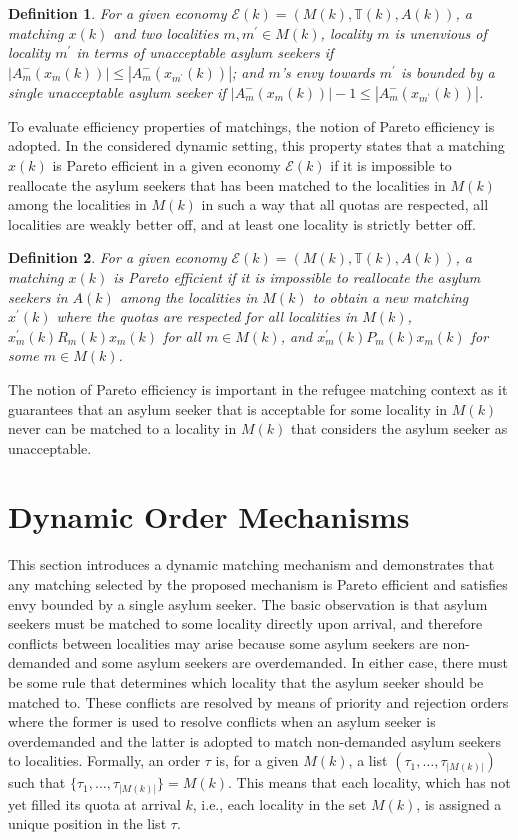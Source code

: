 \documentclass[12pt,fleqn]{article}
\newtheorem{definition}{Definition}
\begin{document}
\begin{definition}\rm\label{DEF:1-Envy_UNACC}
For a given economy $\mathcal{E}(k)=(M(k),\mathbb{T}(k),A(k))$, a matching $x(k)$ and two localities $m,m^\prime\in M(k)$, locality $m$ is unenvious of locality $m^\prime$ in terms of unacceptable asylum seekers if $|A_m^-(x_m(k))|\leq |A_m^-(x_{m^\prime}(k))|$; and $m$'s envy towards $m^\prime$ is bounded by a single unacceptable asylum seeker if $|A_m^-(x_m(k))|-1\leq |A_m^-(x_{m^\prime}(k))|$.
\end{definition}
\noindent To evaluate efficiency properties of matchings, the notion of Pareto efficiency is adopted. In the considered dynamic setting, this property states that a matching $x(k)$ is Pareto efficient in a given economy $\mathcal{E}(k)$ if it is impossible to reallocate the asylum seekers that has been matched to the localities in $M(k)$ among the localities in $M(k)$ in such a way that all quotas are respected, all localities are weakly better off, and at least one locality is strictly better off.
\begin{definition}\rm\label{DEF:Efficiency}
For a given economy $\mathcal{E}(k)=(M(k),\mathbb{T}(k),A(k))$, a matching $x(k)$ is Pareto efficient if it is impossible to reallocate the asylum seekers in $A(k)$ among the localities in $M(k)$ to obtain a new matching $x^\prime(k)$ where the quotas are respected for all localities in $M(k)$, $x_m^\prime(k)R_m(k) x_m(k)$ for all $m\in M(k)$, and $x_m^\prime(k)P_m(k) x_m(k)$ for some $m\in M(k)$.
\end{definition}
\noindent The notion of Pareto efficiency is important in the refugee matching context as it guarantees that an asylum seeker that is acceptable for some locality in $M(k)$ never can be matched to a locality in $M(k)$ that considers the asylum seeker as unacceptable.

\section{Dynamic Order Mechanisms}\label{SEC:Structure_Mechanisms}
This section introduces a dynamic matching mechanism and demonstrates that any matching selected by the proposed mechanism is Pareto efficient and satisfies envy bounded by a single asylum seeker. The basic observation is that asylum seekers must be matched to some locality directly upon arrival, and therefore conflicts between localities may arise because some asylum seekers are non-demanded and some asylum seekers are overdemanded. In either case, there must be some rule that determines which locality that the asylum seeker should be matched to. These conflicts are resolved by means of priority and rejection orders where the former is used to resolve conflicts when an asylum seeker is overdemanded and the latter is adopted to match non-demanded asylum seekers to localities. Formally, an order $\tau$ is, for a given $M(k)$, a list $(\tau_1,\ldots,\tau_{|M(k)|})$ such that $\{\tau_1,\ldots, \tau_{|M(k)|}\}=M(k)$. This means that each locality, which has not yet filled its quota at arrival $k$, i.e., each locality in the set $M(k)$, is assigned a unique position in the list $\tau$.
\end{document}
